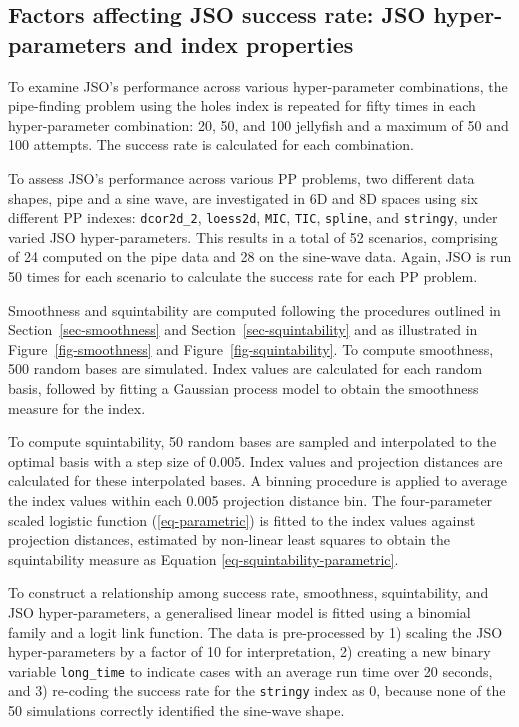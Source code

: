 \documentclass[
  12pt,
]{interact}
\theoremstyle{plain}
\begin{document}
\subsection{Factors affecting JSO success rate: JSO hyper-parameters and
index properties}\label{sec-app-2}

To examine JSO's performance across various hyper-parameter
combinations, the pipe-finding problem using the holes index is repeated
for fifty times in each hyper-parameter combination: 20, 50, and 100
jellyfish and a maximum of 50 and 100 attempts. The success rate is
calculated for each combination.

To assess JSO's performance across various PP problems, two different
data shapes, pipe and a sine wave, are investigated in 6D and 8D spaces
using six different PP indexes: \texttt{dcor2d\_2}, \texttt{loess2d},
\texttt{MIC}, \texttt{TIC}, \texttt{spline}, and \texttt{stringy}, under
varied JSO hyper-parameters. This results in a total of 52 scenarios,
comprising of 24 computed on the pipe data and 28 on the sine-wave data.
Again, JSO is run 50 times for each scenario to calculate the success
rate for each PP problem.

Smoothness and squintability are computed following the procedures
outlined in Section~\ref{sec-smoothness} and
Section~\ref{sec-squintability} and as illustrated in
Figure~\ref{fig-smoothness} and Figure~\ref{fig-squintability}. To
compute smoothness, 500 random bases are simulated. Index values are
calculated for each random basis, followed by fitting a Gaussian process
model to obtain the smoothness measure for the index.

To compute squintability, 50 random bases are sampled and interpolated
to the optimal basis with a step size of 0.005. Index values and
projection distances are calculated for these interpolated bases. A
binning procedure is applied to average the index values within each
0.005 projection distance bin. The four-parameter scaled logistic
function (\ref{eq-parametric}) is fitted to the index values against
projection distances, estimated by non-linear least squares to obtain
the squintability measure as Equation \ref{eq-squintability-parametric}.

To construct a relationship among success rate, smoothness,
squintability, and JSO hyper-parameters, a generalised linear model is
fitted using a binomial family and a logit link function. The data is
pre-processed by 1) scaling the JSO hyper-parameters by a factor of 10
for interpretation, 2) creating a new binary variable
\texttt{long\_time} to indicate cases with an average run time over 20
seconds, and 3) re-coding the success rate for the \texttt{stringy}
index as 0, because none of the 50 simulations correctly identified the
sine-wave shape.
\end{document}

